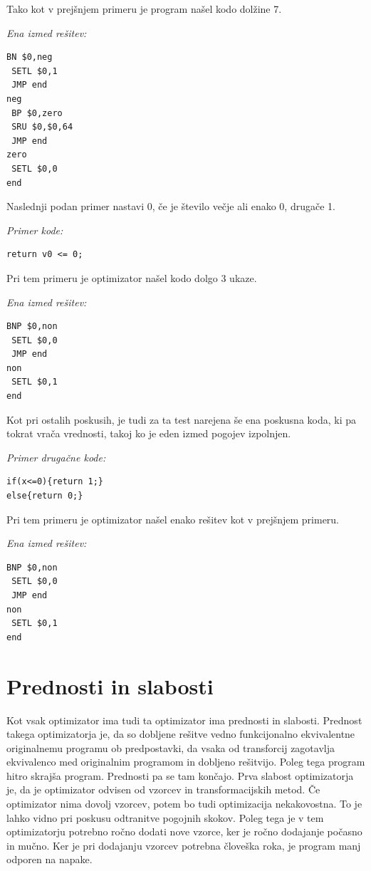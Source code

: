 \documentclass[a4paper, 12pt]{book}
\begin{document}
Tako kot v prejšnjem primeru je program našel kodo dolžine 7.

\medskip

\noindent
{\it Ena izmed rešitev:}
\begin{Verbatim}[baselinestretch=1]
 BN $0,neg
 SETL $0,1
 JMP end
neg 
 BP $0,zero
 SRU $0,$0,64
 JMP end
zero 
 SETL $0,0
end
\end{Verbatim}

Naslednji podan primer nastavi 0, če je število večje ali enako 0, drugače 1.

\medskip

\noindent
{\it Primer kode:}
\begin{Verbatim}[baselinestretch=1]
return v0 <= 0;
\end{Verbatim}

Pri tem primeru je optimizator našel kodo dolgo 3 ukaze.

\medskip

\noindent
{\it Ena izmed rešitev:}
\begin{Verbatim}[baselinestretch=1]
 BNP $0,non
 SETL $0,0
 JMP end
non
 SETL $0,1
end
\end{Verbatim}

Kot pri ostalih poskusih, je tudi za ta test narejena še ena poskusna koda, ki pa tokrat vrača vrednosti, takoj ko je eden izmed pogojev izpolnjen.

\medskip

\noindent
{\it Primer drugačne kode:}
\begin{Verbatim}[baselinestretch=1]
if(x<=0){return 1;}
else{return 0;}
\end{Verbatim}

Pri tem primeru je optimizator našel enako rešitev kot v prejšnjem primeru.

\medskip

\noindent
{\it Ena izmed rešitev:}
\begin{Verbatim}[baselinestretch=1]
 BNP $0,non
 SETL $0,0
 JMP end
non
 SETL $0,1
end
\end{Verbatim}

\section{Prednosti in slabosti}

Kot vsak optimizator ima tudi ta optimizator ima prednosti in slabosti. Prednost takega optimizatorja je, da so dobljene rešitve vedno funkcijonalno ekvivalentne originalnemu programu ob predpostavki, da vsaka od transforcij zagotavlja ekvivalenco med originalnim programom in dobljeno rešitvijo. Poleg tega program hitro skrajša program. Prednosti pa se tam končajo. Prva slabost optimizatorja je, da je optimizator odvisen od vzorcev in transformacijskih metod. Če optimizator nima dovolj vzorcev, potem bo tudi optimizacija nekakovostna. To je lahko vidno pri poskusu odtranitve pogojnih skokov. Poleg tega je v tem optimizatorju potrebno ročno dodati nove vzorce, ker je ročno dodajanje počasno in mučno. Ker je pri dodajanju vzorcev potrebna človeška roka, je program manj odporen na napake.
\end{document}
